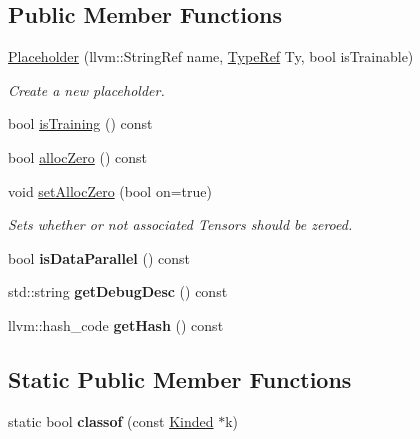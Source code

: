 \subsection*{Public Member Functions}
\begin{DoxyCompactItemize}
\item 
\mbox{\label{classglow_1_1_placeholder_a6d1912ade10ee4831479a486de62db4e}} 
\hyperlink{classglow_1_1_placeholder_a6d1912ade10ee4831479a486de62db4e}{Placeholder} (llvm\+::\+String\+Ref name, \hyperlink{structglow_1_1_type}{Type\+Ref} Ty, bool is\+Trainable)
\begin{DoxyCompactList}\small\item\em Create a new placeholder. \end{DoxyCompactList}\item 
bool \hyperlink{classglow_1_1_placeholder_ae55a57afde49e54d9f6a210f083645f1}{is\+Training} () const
\item 
bool \hyperlink{classglow_1_1_placeholder_a037101fe1379191f958f4f6ddcfbd1fb}{alloc\+Zero} () const
\item 
\mbox{\label{classglow_1_1_placeholder_aefa7a7826b6b7847e67aa03c4d8cac50}} 
void \hyperlink{classglow_1_1_placeholder_aefa7a7826b6b7847e67aa03c4d8cac50}{set\+Alloc\+Zero} (bool on=true)
\begin{DoxyCompactList}\small\item\em Sets whether or not associated Tensors should be zeroed. \end{DoxyCompactList}\item 
\mbox{\label{classglow_1_1_placeholder_a8d64c7a0f16a423639e9a640e0a8d0ed}} 
bool {\bfseries is\+Data\+Parallel} () const
\item 
\mbox{\label{classglow_1_1_placeholder_a59fb2755d53564f4e94e094abaa64b93}} 
std\+::string {\bfseries get\+Debug\+Desc} () const
\item 
\mbox{\label{classglow_1_1_placeholder_a0360a95e66eac6e6bf7d0b51862e8a5d}} 
llvm\+::hash\+\_\+code {\bfseries get\+Hash} () const
\end{DoxyCompactItemize}
\subsection*{Static Public Member Functions}
\begin{DoxyCompactItemize}
\item 
\mbox{\label{classglow_1_1_placeholder_aab406d0a17d52f839a35c628e7423f2b}} 
static bool {\bfseries classof} (const \hyperlink{classglow_1_1_kinded}{Kinded} $\ast$k)
\end{DoxyCompactItemize}
